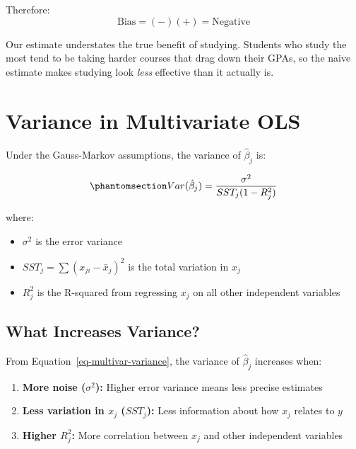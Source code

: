 \documentclass[
  letterpaper,
  DIV=11,
  numbers=noendperiod]{scrreprt}
\providecommand{\tightlist}{%
  \setlength{\itemsep}{0pt}\setlength{\parskip}{0pt}}
\begin{document}
Therefore: \[\text{Bias} = (-)(+) = \text{Negative}\]

Our estimate understates the true benefit of studying. Students who
study the most tend to be taking harder courses that drag down their
GPAs, so the naive estimate makes studying look \emph{less} effective
than it actually is.

\section{Variance in Multivariate
OLS}\label{variance-in-multivariate-ols}

Under the Gauss-Markov assumptions, the variance of \(\hat{\beta}_j\)
is:

\begin{equation}\protect\phantomsection\label{eq-multivar-variance}{
Var(\hat{\beta}_j) = \frac{\sigma^2}{SST_j (1 - R_j^2)}
}\end{equation}

where:

\begin{itemize}
\tightlist
\item
  \(\sigma^2\) is the error variance
\item
  \(SST_j = \sum(x_{ji} - \bar{x}_j)^2\) is the total variation in
  \(x_j\)
\item
  \(R_j^2\) is the R-squared from regressing \(x_j\) on all other
  independent variables
\end{itemize}

\subsection{What Increases Variance?}\label{what-increases-variance}

From Equation~\ref{eq-multivar-variance}, the variance of
\(\hat{\beta}_j\) increases when:

\begin{enumerate}
\def\labelenumi{\arabic{enumi}.}
\tightlist
\item
  \textbf{More noise (\(\sigma^2\)):} Higher error variance means less
  precise estimates
\item
  \textbf{Less variation in \(x_j\) (\(SST_j\)):} Less information about
  how \(x_j\) relates to \(y\)
\item
  \textbf{Higher \(R_j^2\):} More correlation between \(x_j\) and other
  independent variables
\end{enumerate}
\end{document}

